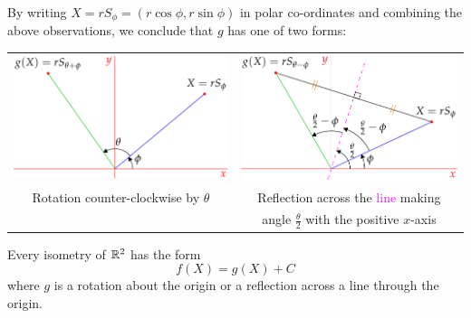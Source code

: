 By writing $X=rS_\phi=(r\cos\phi,r\sin\phi)$ in polar co-ordinates and combining the above observations, we conclude that $g$ has one of two forms:
\begin{center}
	\begin{tabular}{c@{\qquad}c}
		\includegraphics[scale=0.95]{isom-rot}
		&
		\includegraphics[scale=0.95]{isom-refl}\\
		Rotation counter-clockwise by $\theta$
		&
		Reflection across the \textcolor{Magenta}{line} making
		\\
		&
		angle $\frac\theta 2$ with the positive $x$-axis
	\end{tabular}
\end{center}

\begin{thm}{}{}
	Every isometry of $\mathbb{R}^2$ has the form
	\[
		f(X)=g(X)+C
	\]
	where $g$ is a rotation about the origin or a reflection across a line through the origin. 
\end{thm}

\goodbreak



